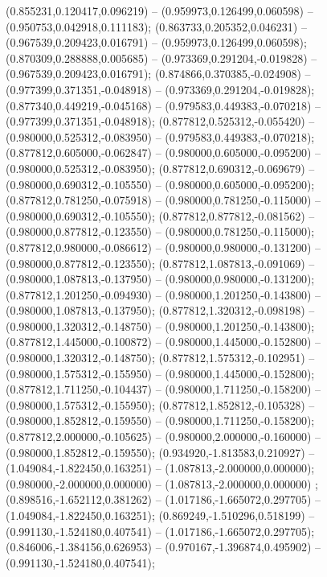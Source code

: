  (0.855231,0.120417,0.096219) -- (0.959973,0.126499,0.060598) -- (0.950753,0.042918,0.111183);
 (0.863733,0.205352,0.046231) -- (0.967539,0.209423,0.016791) -- (0.959973,0.126499,0.060598);
 (0.870309,0.288888,0.005685) -- (0.973369,0.291204,-0.019828) -- (0.967539,0.209423,0.016791);
 (0.874866,0.370385,-0.024908) -- (0.977399,0.371351,-0.048918) -- (0.973369,0.291204,-0.019828);
 (0.877340,0.449219,-0.045168) -- (0.979583,0.449383,-0.070218) -- (0.977399,0.371351,-0.048918);
 (0.877812,0.525312,-0.055420) -- (0.980000,0.525312,-0.083950) -- (0.979583,0.449383,-0.070218);
 (0.877812,0.605000,-0.062847) -- (0.980000,0.605000,-0.095200) -- (0.980000,0.525312,-0.083950);
 (0.877812,0.690312,-0.069679) -- (0.980000,0.690312,-0.105550) -- (0.980000,0.605000,-0.095200);
 (0.877812,0.781250,-0.075918) -- (0.980000,0.781250,-0.115000) -- (0.980000,0.690312,-0.105550);
 (0.877812,0.877812,-0.081562) -- (0.980000,0.877812,-0.123550) -- (0.980000,0.781250,-0.115000);
 (0.877812,0.980000,-0.086612) -- (0.980000,0.980000,-0.131200) -- (0.980000,0.877812,-0.123550);
 (0.877812,1.087813,-0.091069) -- (0.980000,1.087813,-0.137950) -- (0.980000,0.980000,-0.131200);
 (0.877812,1.201250,-0.094930) -- (0.980000,1.201250,-0.143800) -- (0.980000,1.087813,-0.137950);
 (0.877812,1.320312,-0.098198) -- (0.980000,1.320312,-0.148750) -- (0.980000,1.201250,-0.143800);
 (0.877812,1.445000,-0.100872) -- (0.980000,1.445000,-0.152800) -- (0.980000,1.320312,-0.148750);
 (0.877812,1.575312,-0.102951) -- (0.980000,1.575312,-0.155950) -- (0.980000,1.445000,-0.152800);
 (0.877812,1.711250,-0.104437) -- (0.980000,1.711250,-0.158200) -- (0.980000,1.575312,-0.155950);
 (0.877812,1.852812,-0.105328) -- (0.980000,1.852812,-0.159550) -- (0.980000,1.711250,-0.158200);
 (0.877812,2.000000,-0.105625) -- (0.980000,2.000000,-0.160000) -- (0.980000,1.852812,-0.159550);
 (0.934920,-1.813583,0.210927) -- (1.049084,-1.822450,0.163251) -- (1.087813,-2.000000,0.000000);
 (0.980000,-2.000000,0.000000) -- (1.087813,-2.000000,0.000000) ;
 (0.898516,-1.652112,0.381262) -- (1.017186,-1.665072,0.297705) -- (1.049084,-1.822450,0.163251);
 (0.869249,-1.510296,0.518199) -- (0.991130,-1.524180,0.407541) -- (1.017186,-1.665072,0.297705);
 (0.846006,-1.384156,0.626953) -- (0.970167,-1.396874,0.495902) -- (0.991130,-1.524180,0.407541);
